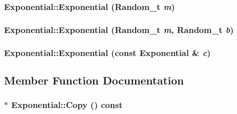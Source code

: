 \hypertarget{classExponential_62d588bfc48c87b4cf30badcd306cfa3}{
\subsubsection[{Exponential}]{\setlength{\rightskip}{0pt plus 5cm}Exponential::Exponential ({\bf Random\_\-t} {\em m})}}
\label{classExponential_62d588bfc48c87b4cf30badcd306cfa3}


\hypertarget{classExponential_469f22991fc0e7192e395ffde9b6a1ce}{
\subsubsection[{Exponential}]{\setlength{\rightskip}{0pt plus 5cm}Exponential::Exponential ({\bf Random\_\-t} {\em m}, \/  {\bf Random\_\-t} {\em b})}}
\label{classExponential_469f22991fc0e7192e395ffde9b6a1ce}


\hypertarget{classExponential_5b49e6e7f936a44f88a54aa3ff5e6e61}{
\subsubsection[{Exponential}]{\setlength{\rightskip}{0pt plus 5cm}Exponential::Exponential (const {\bf Exponential} \& {\em c})}}
\label{classExponential_5b49e6e7f936a44f88a54aa3ff5e6e61}




\subsection{Member Function Documentation}
\hypertarget{classExponential_f7c51eb8cb4fee14f659a55f994e981f}{
\subsubsection[{Copy}]{ $\ast$ Exponential::Copy () const}}
\label{classExponential_f7c51eb8cb4fee14f659a55f994e981f}




